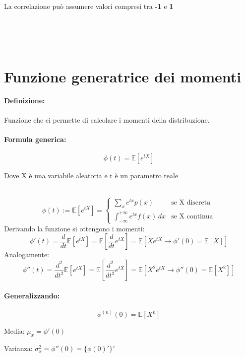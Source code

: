 \documentclass[]{article}
\newcommand{\ev}{\mathbb{E}[X]}
\renewcommand{\ev}[1]{\mathbb{E}[#1]}
\newcommand{\definizione}{\paragraph{Definizione:}}
\newcommand{\formula}{\paragraph{Formula generica:}}
\begin{document}
    \begin{center}
        La correlazione può assumere valori compresi tra \textbf{-1} e \textbf{1}
    \end{center}
     \\
     \\
     \\

    \newpage
    \section{Funzione generatrice dei momenti}
    \definizione Funzione che ci permette di calcolare i momenti della distribuzione.
    \formula \[ \phi(t) = \ev{e^{tX}}\]
    \centerline{Dove X è una variabile aleatoria e t è un parametro reale} \\
    \begin{equation*}
        \phi(t) := \ev{e^{tX}} = 
        \displaystyle
        \begin{cases}
            \displaystyle \sum_{x}^{} e^{tx}p(x) & \text{se X discreta} \\
            \displaystyle \int_{-\infty}^{+\infty} e^{tx} f(x) \, dx & \text{se X continua}
        \end{cases}
    \end{equation*}
    \linebreak[10]
    Derivando la funzione si ottengono i momenti:
    \[ \phi'(t) = \frac{d}{dt} \ev{e^{tX}} = \ev{\frac{d}{dt} e^{tX}} = \ev{Xe^{tX} \longrightarrow \phi'(0) = \ev{X}}\]
    \linebreak[10]
    Analogamente:
    \[ \phi''(t) = \frac{d^2}{dt^2} \ev{e^{tX}} = \ev{\frac{d^2}{dt^2} e^{tX}} = \ev{X^2e^{tX} \longrightarrow \phi''(0) = \ev{X^2}}\]


    \paragraph{Generalizzando:} \[ \phi^{(n)}(0) = \ev{X^n} \]

    \begin{minipage}{0.45\linewidth}
        Media:
        $ \mu_x = \phi'(0) $
    \end{minipage}
    \begin{minipage}{0.45\linewidth}
        Varianza:
        $ \sigma^{2}_x = \phi''(0) = \{\phi(0)'\}' $
    \end{minipage}
\end{document}
